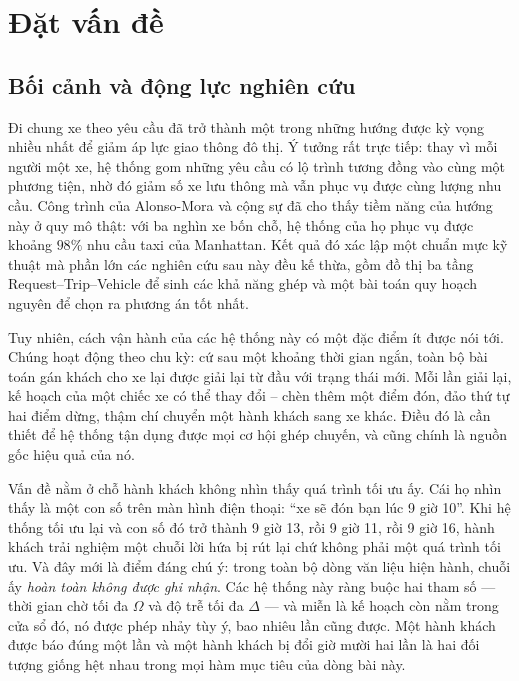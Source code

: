 \chapter{Đặt vấn đề}

\section{Bối cảnh và động lực nghiên cứu}

Đi chung xe theo yêu cầu đã trở thành một trong những hướng được kỳ vọng nhiều nhất để giảm
áp lực giao thông đô thị. Ý tưởng rất trực tiếp: thay vì mỗi người một xe, hệ thống gom những
yêu cầu có lộ trình tương đồng vào cùng một phương tiện, nhờ đó giảm số xe lưu thông mà vẫn
phục vụ được cùng lượng nhu cầu. Công trình của Alonso-Mora và cộng sự \cite{alonsomora2017}
đã cho thấy tiềm năng của hướng này ở quy mô thật: với ba nghìn xe bốn chỗ, hệ thống của họ
phục vụ được khoảng $98\%$ nhu cầu taxi của Manhattan. Kết quả đó xác lập một chuẩn mực kỹ
thuật mà phần lớn các nghiên cứu sau này đều kế thừa, gồm đồ thị ba tầng Request--Trip--Vehicle
để sinh các khả năng ghép và một bài toán quy hoạch nguyên để chọn ra phương án tốt nhất.

Tuy nhiên, cách vận hành của các hệ thống này có một đặc điểm ít được nói tới. Chúng hoạt động
theo chu kỳ: cứ sau một khoảng thời gian ngắn, toàn bộ bài toán gán khách cho xe lại được giải
lại từ đầu với trạng thái mới. Mỗi lần giải lại, kế hoạch của một chiếc xe có thể thay đổi --
chèn thêm một điểm đón, đảo thứ tự hai điểm dừng, thậm chí chuyển một hành khách sang xe khác.
Điều đó là cần thiết để hệ thống tận dụng được mọi cơ hội ghép chuyến, và cũng chính là nguồn
gốc hiệu quả của nó.

Vấn đề nằm ở chỗ hành khách không nhìn thấy quá trình tối ưu ấy. Cái họ nhìn thấy là một con
số trên màn hình điện thoại: ``xe sẽ đón bạn lúc 9 giờ 10''. Khi hệ thống tối ưu lại và con số
đó trở thành 9 giờ 13, rồi 9 giờ 11, rồi 9 giờ 16, hành khách trải nghiệm một chuỗi lời hứa bị
rút lại chứ không phải một quá trình tối ưu. Và đây mới là điểm đáng chú ý: trong toàn bộ dòng
văn liệu hiện hành, chuỗi ấy \emph{hoàn toàn không được ghi nhận}. Các hệ thống này ràng buộc
hai tham số --- thời gian chờ tối đa $\Omega$ và độ trễ tối đa $\Delta$ --- và miễn là kế hoạch
còn nằm trong cửa sổ đó, nó được phép nhảy tùy ý, bao nhiêu lần cũng được. Một hành khách được
báo đúng một lần và một hành khách bị đổi giờ mười hai lần là hai đối tượng giống hệt nhau
trong mọi hàm mục tiêu của dòng bài này.

